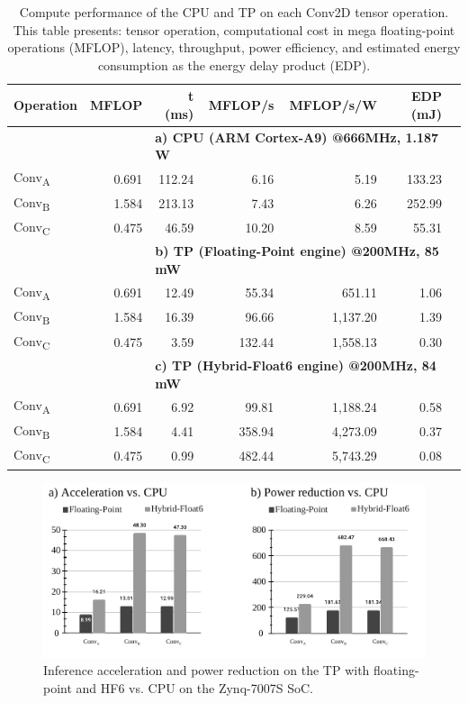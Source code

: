 \begin{table}[!t]\centering
	\caption{Compute performance of the CPU and TP on each Conv2D tensor operation. This table presents: tensor operation, computational cost in mega floating-point operations (MFLOP), latency, throughput, power efficiency, and estimated energy consumption as the energy delay product (EDP).}\label{tab:performance}
	\scriptsize
	\begin{tabular}{lrrrrrr}\toprule
		\textbf{Operation} &\textbf{MFLOP} &\textbf{t (ms)} &\textbf{MFLOP/s} &\textbf{MFLOP/s/W} &\textbf{EDP (mJ)} \\\midrule
		& &\multicolumn{4}{l}{\textbf{a) CPU (ARM Cortex-A9) @666MHz, 1.187 W}} \\
		Conv\textsubscript{A} &0.691 &112.24 &6.16 &5.19 &133.23 \\
		Conv\textsubscript{B} &1.584 &213.13 &7.43 &6.26 &252.99 \\
		Conv\textsubscript{C} &0.475 &46.59 &10.20 &8.59 &55.31 \\
		& &\multicolumn{4}{l}{\textbf{b) TP (Floating-Point engine) @200MHz, 85 mW}} \\
		Conv\textsubscript{A} &0.691 &12.49 &55.34 &651.11 &1.06 \\
		Conv\textsubscript{B} &1.584 &16.39 &96.66 &1,137.20 &1.39 \\
		Conv\textsubscript{C} &0.475 &3.59 &132.44 &1,558.13 &0.30 \\
		& &\multicolumn{4}{l}{\textbf{c) TP (Hybrid-Float6 engine) @200MHz, 84 mW}} \\
		Conv\textsubscript{A} &0.691 &6.92 &99.81 &1,188.24 &0.58 \\
		Conv\textsubscript{B} &1.584 &4.41 &358.94 &4,273.09 &0.37 \\
		Conv\textsubscript{C} &0.475 &0.99 &482.44 &5,743.29 &0.08 \\
		\bottomrule
	\end{tabular}
\end{table}

\begin{figure}[t!]
	\centering
	\includegraphics[width=1\columnwidth]{../figures/power_breakdown/acceleration_power_reduction.pdf}
	\caption{Inference acceleration and power reduction on the TP with floating-point and HF6 vs. CPU on the Zynq-7007S SoC.}
	\label{fig:acceleration}
\end{figure}


